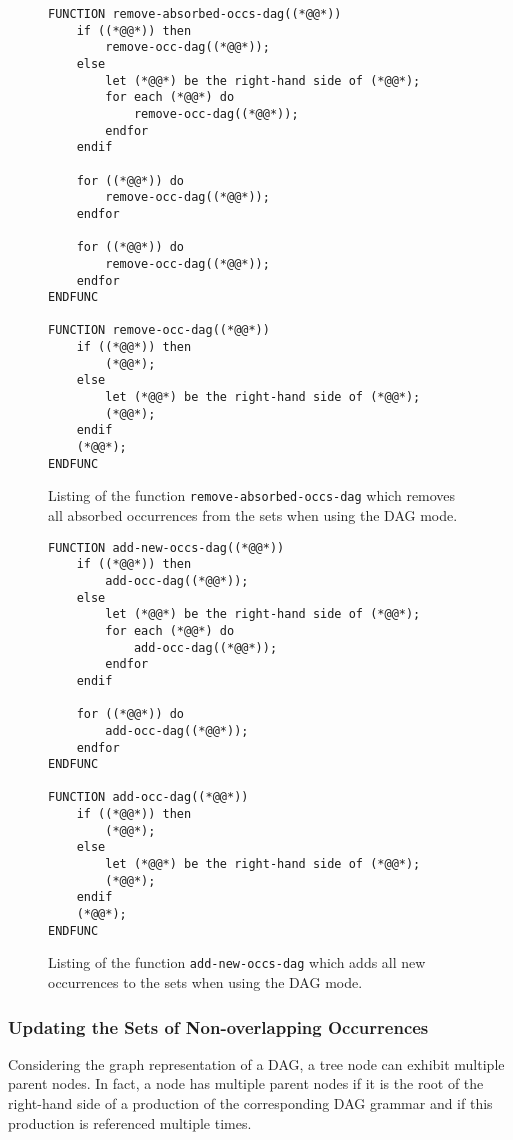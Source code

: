 \documentclass[12pt]{llncs}
\begin{document}
\begin{figure}[tb]
	\begin{lstlisting}
FUNCTION remove-absorbed-occs-dag((*@@*))
	if ((*@@*)) then
		remove-occ-dag((*@@*));
	else
		let (*@@*) be the right-hand side of (*@@*);
		for each (*@@*) do
			remove-occ-dag((*@@*));
		endfor
	endif
	
	for ((*@@*)) do
		remove-occ-dag((*@@*));
	endfor
	
	for ((*@@*)) do
		remove-occ-dag((*@@*));
	endfor
ENDFUNC	

FUNCTION remove-occ-dag((*@@*))
	if ((*@@*)) then
		(*@@*);
	else
		let (*@@*) be the right-hand side of (*@@*);
		(*@@*);
	endif
	(*@@*);
ENDFUNC	
	\end{lstlisting}
	\caption{Listing of the function \texttt{remove-absorbed-occs-dag} which removes all absorbed occurrences from the  sets when using the DAG mode.}\label{lst:remove-absorbed-occs-dag}
\end{figure}
\begin{figure}[tb]
	\begin{lstlisting}
FUNCTION add-new-occs-dag((*@@*))
	if ((*@@*)) then
		add-occ-dag((*@@*));
	else
		let (*@@*) be the right-hand side of (*@@*);
		for each (*@@*) do
			add-occ-dag((*@@*));
		endfor
	endif
	
	for ((*@@*)) do
		add-occ-dag((*@@*));
	endfor
ENDFUNC	

FUNCTION add-occ-dag((*@@*))
	if ((*@@*)) then
		(*@@*);
	else
		let (*@@*) be the right-hand side of (*@@*);
		(*@@*);
	endif
	(*@@*);
ENDFUNC	
	\end{lstlisting}
	\caption{Listing of the function \texttt{add-new-occs-dag} which adds all new occurrences to the  sets when using the DAG mode.}\label{lst:add-new-occs-dag}
\end{figure}

\subsubsection{Updating the Sets of Non-overlapping Occurrences}

Considering the graph representation of a DAG, a tree node can exhibit multiple parent nodes. In fact, a node has multiple parent nodes if it is the root of the right-hand side of a production of the corresponding DAG grammar and if this production is referenced multiple times.
\end{document}
